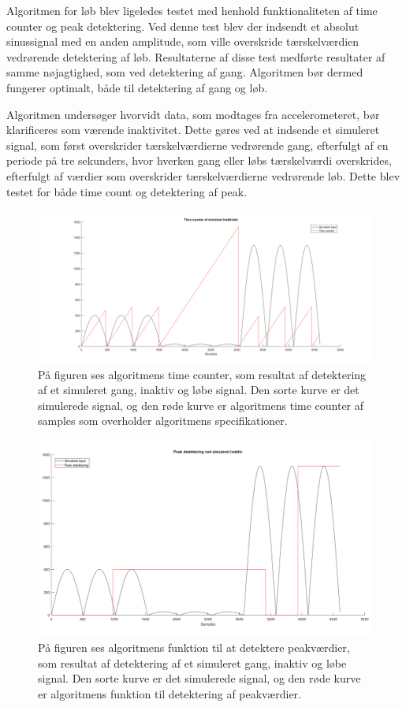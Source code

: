 Algoritmen for løb blev ligeledes testet med henhold funktionaliteten af time counter og peak detektering. Ved denne test blev der indsendt et absolut sinussignal med en anden amplitude, som ville overskride tærskelværdien vedrørende detektering af løb. Resultaterne af disse test medførte resultater af samme nøjagtighed, som ved detektering af gang. Algoritmen bør dermed fungerer optimalt, både til detektering af gang og løb. 

Algoritmen undersøger hvorvidt data, som modtages fra accelerometeret, bør klarificeres som værende inaktivitet. Dette gøres ved at indsende et simuleret signal, som først overskrider tærskelværdierne vedrørende gang, efterfulgt af en periode på tre sekunders, hvor hverken gang eller løbs tærskelværdi overskrides, efterfulgt af værdier som overskrider tærskelværdierne vedrørende løb. Dette blev testet for både time count og detektering af peak. 
\begin{figure}[H]
	\centering
	\includegraphics[scale=0.3]{figures/cDesign/test_timecount_inaktiv.png}
	\caption{På figuren ses algoritmens time counter, som resultat af detektering af et simuleret gang, inaktiv og løbe signal. Den sorte kurve er det simulerede signal, og den røde kurve er algoritmens time counter af samples som overholder algoritmens specifikationer.}
	\label{fig:test_inaktiv_time}
\end{figure}
\begin{figure}[H]
	\centering
	\includegraphics[scale=0.3]{figures/cDesign/test_peak_inaktiv.png}
	\caption{På figuren ses algoritmens funktion til at detektere peakværdier, som resultat af detektering af et simuleret gang, inaktiv og løbe signal. Den sorte kurve er det simulerede signal, og den røde kurve er algoritmens funktion til detektering af peakværdier. }
	\label{fig:test_inaktiv_peak}
\end{figure}
